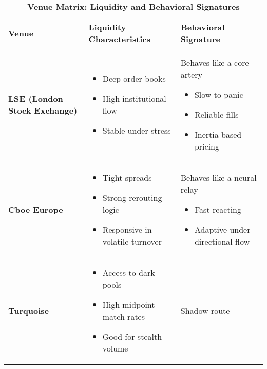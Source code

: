 \begin{table}[H]
    \centering
    \renewcommand{\arraystretch}{1.1}
    \small
    \caption*{\textbf{Venue Matrix: Liquidity and Behavioral Signatures}}
    \begin{tabularx}{\textwidth}{|l|X|X|}
    \hline
    \textbf{Venue} & \textbf{Liquidity Characteristics} & \textbf{Behavioral Signature} \\
    \hline
    \textbf{LSE (London Stock Exchange)} 
        & 
        \begin{itemize}
            \item Deep order books
            \item High institutional flow 
            \item Stable under stress
        \end{itemize}
        & 
        Behaves like a core artery 
        \begin{itemize}
            \item Slow to panic 
            \item Reliable fills
            \item Inertia-based pricing
        \end{itemize} 
        \\
    \hline
    \textbf{Cboe Europe} 
        & 
            \begin{itemize}
                \item Tight spreads 
                \item Strong rerouting logic 
                \item Responsive in volatile turnover 
            \end{itemize}
        & 
            Behaves like a neural relay 
            \begin{itemize}
                \item Fast-reacting 
                \item Adaptive under directional flow 
            \end{itemize}
        \\
    \hline
    \textbf{Turquoise} 
        & 
            \begin{itemize}
                \item Access to dark pools 
                \item High midpoint match rates 
                \item Good for stealth volume 
            \end{itemize}
        & 
            Shadow route

\end{tabularx}
\end{table}
